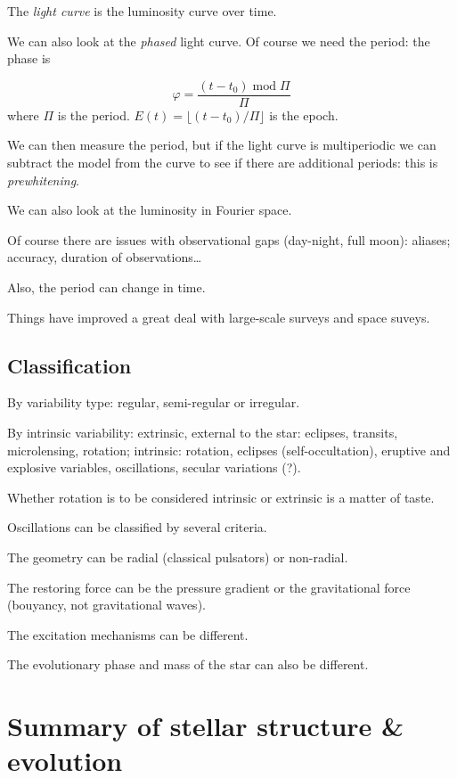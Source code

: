 \documentclass[main.tex]{subfiles}
\begin{document}
The \emph{light curve} is the luminosity curve over time.

We can also look at the \emph{phased} light curve. Of course we need the period:
the phase is

\begin{equation}
    \varphi = \frac{(t-t_0) \operatorname{mod} \Pi}{\Pi}
\end{equation}
%
where \(\Pi\) is the period.
\(E(t) = \lfloor (t-t_0 )/ \Pi \rfloor\) is the epoch.

We can then measure the period, but if the light curve is multiperiodic we can subtract the model from the curve to see if there are additional periods: this is \emph{prewhitening}.

We can also look at the luminosity in Fourier space.

Of course there are issues with observational gaps (day-night, full moon): aliases; accuracy, duration of observations\dots

Also, the period can change in time.

Things have improved a great deal with large-scale surveys and space suveys.

\subsection{Classification}

By variability type: regular, semi-regular or irregular.

By intrinsic variability: extrinsic, external to the star: eclipses, transits, microlensing, rotation; intrinsic: rotation, eclipses (self-occultation), eruptive and explosive variables, oscillations, secular variations (?).

Whether rotation is to be considered intrinsic or extrinsic is a matter of taste.

Oscillations can be classified by several criteria.

The geometry can be  radial (classical pulsators) or non-radial.

The restoring force can be the pressure gradient or the gravitational force (bouyancy, not gravitational waves).

The excitation mechanisms can be different.

The evolutionary phase and mass of the star can also be different.

\section{Summary of stellar structure \& evolution}
\end{document}

